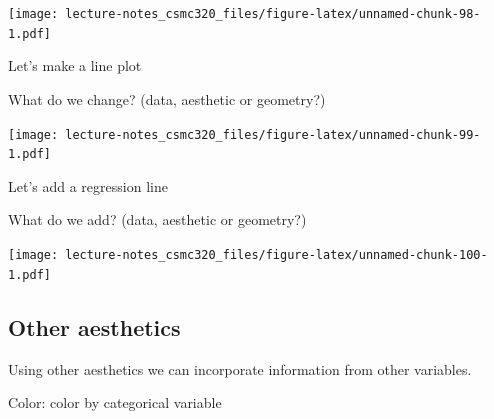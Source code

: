 \documentclass[12pt,]{book}
\newenvironment{Shaded}{\begin{snugshade}}{\end{snugshade}}
\newcommand{\KeywordTok}[1]{\textcolor[rgb]{0.13,0.29,0.53}{\textbf{#1}}}
\newcommand{\DataTypeTok}[1]{\textcolor[rgb]{0.13,0.29,0.53}{#1}}
\newcommand{\DecValTok}[1]{\textcolor[rgb]{0.00,0.00,0.81}{#1}}
\newcommand{\StringTok}[1]{\textcolor[rgb]{0.31,0.60,0.02}{#1}}
\newcommand{\OperatorTok}[1]{\textcolor[rgb]{0.81,0.36,0.00}{\textbf{#1}}}
\newcommand{\NormalTok}[1]{#1}
\theoremstyle{definition}
\theoremstyle{definition}
\theoremstyle{definition}
\theoremstyle{remark}
\begin{document}
\texttt{[image: lecture-notes\_csmc320\_files/figure-latex/unnamed-chunk-98-1.pdf]}

Let's make a line plot

What do we change? (data, aesthetic or geometry?)

\begin{Shaded}
\end{Shaded}

\texttt{[image: lecture-notes\_csmc320\_files/figure-latex/unnamed-chunk-99-1.pdf]}

Let's add a regression line

What do we add? (data, aesthetic or geometry?)

\begin{Shaded}
\end{Shaded}

\texttt{[image: lecture-notes\_csmc320\_files/figure-latex/unnamed-chunk-100-1.pdf]}

\subsection{Other aesthetics}\label{other-aesthetics}

Using other aesthetics we can incorporate information from other
variables.

Color: color by categorical variable
\end{document}
